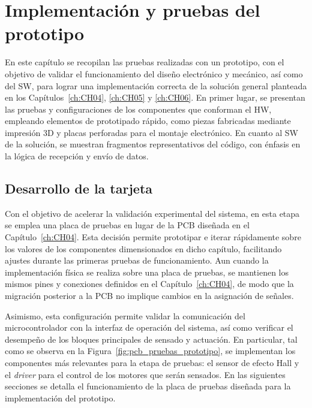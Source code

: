 \chapter{Implementación y pruebas del prototipo}
\label{ch:CH07}

\noindent
En este capítulo se recopilan las pruebas realizadas con un prototipo, con el objetivo de validar el funcionamiento del diseño electrónico y mecánico, así como del \ac{SW}, para lograr una implementación correcta de la solución general planteada en los Capítulos~\ref{ch:CH04}, \ref{ch:CH05} y \ref{ch:CH06}. En primer lugar, se presentan las pruebas y configuraciones de los componentes que conforman el \ac{HW}, empleando elementos de prototipado rápido, como piezas fabricadas mediante impresión 3D y placas perforadas para el montaje electrónico. En cuanto al \ac{SW} de la solución, se muestran fragmentos representativos del código, con énfasis en la lógica de recepción y envío de datos.
\section{Desarrollo de la tarjeta}

\noindent
Con el objetivo de acelerar la validación experimental del sistema, en esta etapa se emplea una placa de pruebas en lugar de la \ac{PCB} diseñada en el Capítulo~\ref{ch:CH04}. Esta decisión permite prototipar e iterar rápidamente sobre los valores de los componentes dimensionados en dicho capítulo, facilitando ajustes durante las primeras pruebas de funcionamiento. Aun cuando la implementación física se realiza sobre una placa de pruebas, se mantienen los mismos pines y conexiones definidos en el Capítulo~\ref{ch:CH04}, de modo que la migración posterior a la \ac{PCB} no implique cambios en la asignación de señales.

\noindent
Asimismo, esta configuración permite validar la comunicación del microcontrolador con la interfaz de operación del sistema, así como verificar el desempeño de los bloques principales de sensado y actuación. En particular, tal como se observa en la Figura~\ref{fig:pcb_pruebas_prototipo}, se implementan los componentes más relevantes para la etapa de pruebas: el sensor de efecto Hall y el \textit{driver} para el control de los motores que serán sensados. En las siguientes secciones se detalla el funcionamiento de la placa de pruebas diseñada para la implementación del prototipo.

